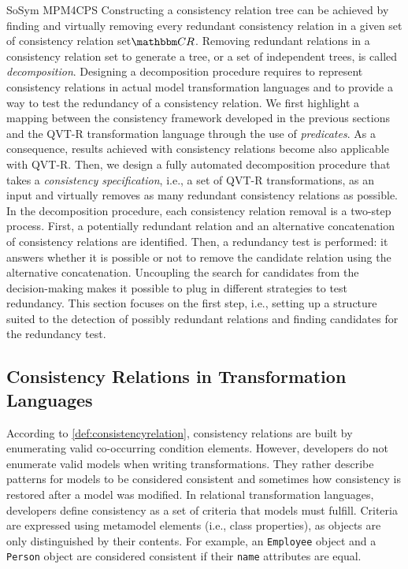 \begin{copiedFrom}{SoSym MPM4CPS}
Constructing a consistency relation tree can be achieved by finding and virtually removing every redundant consistency relation in a given set of consistency relation set$\consistencyrelationset{CR}$. %
%
Removing redundant relations in a consistency relation set to generate a tree, or a set of independent trees, is called \textit{decomposition}. Designing a decomposition procedure requires to represent consistency relations in actual model transformation languages and to provide a way to test the redundancy of a consistency relation. We first highlight a mapping between the consistency framework developed in the previous sections and the QVT-R transformation language through the use of \textit{predicates}. As a consequence, results achieved with consistency relations become also applicable with QVT-R. Then, we design a fully automated decomposition procedure that takes a \emph{consistency specification}, i.e., a set of QVT-R transformations, as an input and virtually removes as many redundant consistency relations as possible. In the decomposition procedure, each consistency relation removal is a two-step process. First, a potentially redundant relation and an alternative concatenation of consistency relations are identified. Then, a redundancy test is performed: it answers whether it is possible or not to remove the candidate relation using the alternative concatenation. Uncoupling the search for candidates from the decision-making makes it possible to plug in different strategies to test redundancy. This section focuses on the first step, i.e., setting up a structure suited to the detection of possibly redundant relations and finding candidates for the redundancy test.

\subsection{Consistency Relations in Transformation Languages}

According to \autoref{def:consistencyrelation}, consistency relations are built by enumerating valid co-occurring condition elements. However, developers do not enumerate valid models when writing transformations. %
They rather describe patterns for models to be considered consistent and sometimes how consistency is restored after a model was modified. %
In relational transformation languages, developers define consistency as a set of criteria that models must fulfill. Criteria are expressed using metamodel elements (i.e., class properties), as objects are only distinguished by their contents. For example, an \texttt{Employee} object and a \texttt{Person} object are considered consistent if their \texttt{name} attributes are equal.


\end{copiedFrom}
